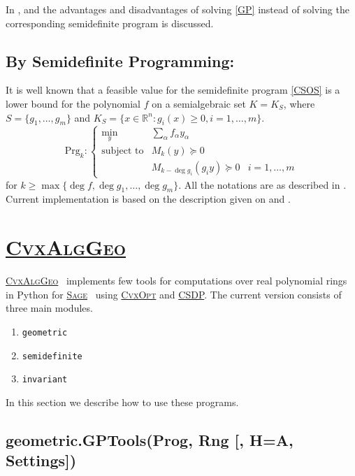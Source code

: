 \documentclass{amsart}
\theoremstyle{definition}
\newcommand{\reals}{\mathbb{R}}
\newcommand{\sage}{\href{http://www.sagemath.org}{\textsc{Sage}}}
\newcommand{\cvxalggeo}{\href{https://github.com/mghasemi/CvxAlgGeo}{\textsc{CvxAlgGeo}}}
\begin{document}
In \cite{lbgpLasserre}, \cite{lbgp} and \cite{genlbgp} the advantages and disadvantages of solving \eqref{GP} instead of solving the corresponding 
semidefinite program is discussed.

\subsection{By Semidefinite Programming:}
It is  well known that a feasible value for the semidefinite program \eqref{CSOS} is a lower bound for the polynomial $f$ on a semialgebraic set $K=K_S$, where 
$S=\{g_1,\dots,g_m\}$ and $K_S=\{x\in\reals^n:g_i(x)\ge0, i=1,\dots,m\}$.
\begin{equation}\label{CSOS}
\textrm{Prg}_k:\left\lbrace\begin{array}{lll}
	\min\limits_y & \sum_{\alpha}f_{\alpha}y_{\alpha} & \\
	\textrm{subject to} & M_k(y)\succeq0 & \\
	 & M_{k-\deg g_i}(g_iy)\succeq0 & i=1,\dots,m
\end{array}\right.
\end{equation}
for $k\ge\max\{\deg f,\deg g_1,\dots,\deg g_m\}$. All the notations are as described in \cite{LasserreSDP}. Current implementation is based on the description 
given on \cite[Chapter 4 and 5]{LasserreMPP} and \cite{Laurent}.
\section{\cvxalggeo}

\cvxalggeo~ implements few tools for computations over real polynomial rings in Python for \sage~ using 
\href{http://abel.ee.ucla.edu/cvxopt/}{\textsc{CvxOpt}} and \href{https://projects.coin-or.org/Csdp/}{CSDP}.
The current version consists of three main modules.
\begin{enumerate}
	\item{\texttt{geometric}}
	\item{\texttt{semidefinite}}
    \item{\texttt{invariant}}
\end{enumerate}
In this section we describe how to use these programs.
	
\subsection{geometric.GPTools(Prog, Rng [, H=A, Settings])}~
\end{document}

